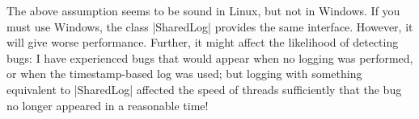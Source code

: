 The above assumption seems to be sound in Linux, but not in Windows.  If you
must use Windows, the class |SharedLog| provides the same interface.  However,
it will give worse performance.  Further, it might affect the likelihood of
detecting bugs: I have experienced bugs that would appear when no logging was
performed, or when the timestamp-based log was used; but logging with
something equivalent to |SharedLog| affected the speed of threads sufficiently
that the bug no longer appeared in a reasonable time!


